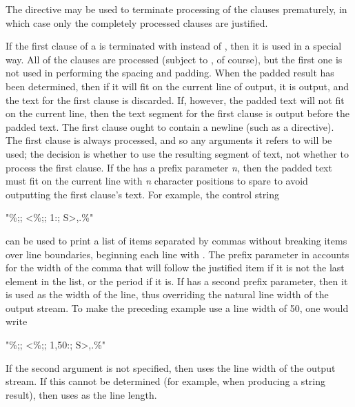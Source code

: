 \begin{flushdesc}
The \cd{{\Xtilde}{\Xcircumflex}} directive may be used to terminate processing
of the clauses prematurely, in which case only the completely processed clauses
are justified.

If the first clause of a \cd{{\Xtilde}<} is terminated with \cd{{\Xtilde}:;} instead of
\cd{{\Xtilde};}, then it is used in a special way.  All of the clauses are
processed (subject to \cd{{\Xtilde}{\Xcircumflex}}, of course), but the first one is not used
in performing the spacing and padding.  When the padded result has been
determined, then if it will fit on the current line of output, it is
output, and the text for the first clause is discarded.  If, however, the
padded text will not fit on the current line, then the text segment for
the first clause is output before the padded text.  The first clause
ought to contain a newline (such as a \cd{{\Xtilde}\%} directive).  The first
clause is always processed, and so any arguments it refers to will be
used; the decision is whether to use the resulting segment of text, not
whether to process the first clause.  If the \cd{{\Xtilde}:;} has a prefix
parameter \emph{n}, then the padded text must fit on the current line with
\emph{n} character positions to spare to avoid outputting the first clause's
text.  For example, the control string
\begin{lisp}
"{\Xtilde}\%;; {\Xtilde}{\Xlbrace}{\Xtilde}<{\Xtilde}\%;; {\Xtilde}1:; {\Xtilde}S{\Xtilde}>{\Xtilde}{\Xcircumflex},{\Xtilde}{\Xrbrace}.{\Xtilde}\%"
\end{lisp}
can be used to print a list of items separated by commas without
breaking items over line boundaries, beginning each line with
\cd{;; }.  The prefix parameter  in  accounts for the width of the
comma that will follow the justified item if it is not the last
element in the list, or the period if it is.  If \cd{{\Xtilde}:;} has a second
prefix parameter, then it is used as the width of the line,
thus overriding the natural line width of the output stream.  To make
the preceding example use a line width of 50, one would write
\begin{lisp}
"{\Xtilde}\%;; {\Xtilde}{\Xlbrace}{\Xtilde}<{\Xtilde}\%;; {\Xtilde}1,50:; {\Xtilde}S{\Xtilde}>{\Xtilde}{\Xcircumflex},{\Xtilde}{\Xrbrace}.{\Xtilde}\%"
\end{lisp}

If the second argument is not specified, then  uses the
line width of the output stream.
If this cannot be determined (for example, when producing a string result),
then  uses  as the line length.


\end{flushdesc}
